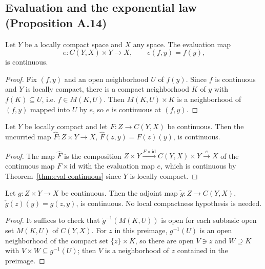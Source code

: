 \subsection{Evaluation and the exponential law (Proposition A.14)}

\begin{theorem}
    \label{thm:eval-continuous}
    \leanok
    Let $Y$ be a locally compact space and $X$ any space. The evaluation map
    \[
        e : C(Y, X) \times Y \to X, \qquad e(f, y) = f(y),
    \]
    is continuous.
\end{theorem}
\begin{proof}
    Fix $(f, y)$ and an open neighborhood $U$ of $f(y)$. Since $f$ is
    continuous and $Y$ is locally compact, there is a compact neighborhood $K$
    of $y$ with $f(K) \subseteq U$, i.e. $f \in M(K, U)$. Then
    $M(K, U) \times K$ is a neighborhood of $(f, y)$ mapped into $U$ by $e$, so
    $e$ is continuous at $(f, y)$.
\end{proof}

\begin{lemma}
    \label{lem:uncurry-cont}
    \leanok
    Let $Y$ be locally compact and let $F : Z \to C(Y, X)$ be continuous. Then
    the uncurried map $\widehat{F} : Z \times Y \to X$, $\widehat{F}(z, y) =
    F(z)(y)$, is continuous.
\end{lemma}
\begin{proof}
    The map $\widehat{F}$ is the composition
    $Z \times Y \xrightarrow{F \times \mathrm{id}} C(Y, X) \times Y
    \xrightarrow{e} X$ of the continuous map $F \times \mathrm{id}$ with the
    evaluation map $e$, which is continuous by
    Theorem~\ref{thm:eval-continuous} since $Y$ is locally compact.
\end{proof}

\begin{lemma}
    \label{lem:curry-cont}
    \leanok
    Let $g : Z \times Y \to X$ be continuous. Then the adjoint map
    $\check{g} : Z \to C(Y, X)$, $\check{g}(z)(y) = g(z, y)$, is continuous.
    No local compactness hypothesis is needed.
\end{lemma}
\begin{proof}
    It suffices to check that $\check{g}^{-1}(M(K, U))$ is open for each
    subbasic open set $M(K, U)$ of $C(Y, X)$. For $z$ in this preimage,
    $g^{-1}(U)$ is an open neighborhood of the compact set $\{z\} \times K$, so
    there are open $V \ni z$ and $W \supseteq K$ with $V \times W \subseteq
    g^{-1}(U)$; then $V$ is a neighborhood of $z$ contained in the preimage.
\end{proof}

